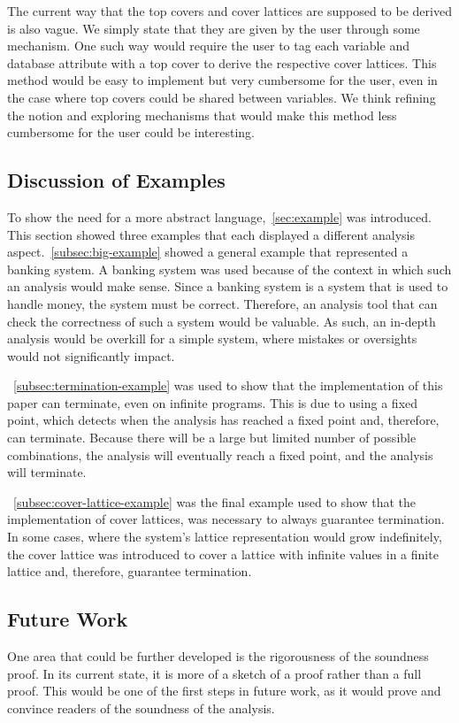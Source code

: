 The current way that the top covers and cover lattices are supposed to be derived is also vague. We simply state that they are given by the user through some mechanism.
One such way would require the user to tag each variable and database attribute with a top cover to derive the respective cover lattices.
This method would be easy to implement but very cumbersome for the user, even in the case where top covers could be shared between variables.
We think refining the notion and exploring mechanisms that would make this method less cumbersome for the user could be interesting.


\subsection{Discussion of Examples}\label{subsec:example-discussion}
To show the need for a more abstract language,~\autoref{sec:example} was introduced. This section showed three examples that each displayed a different analysis aspect.~\autoref{subsec:big-example} showed a general example that represented a banking system. A banking system was used because of the context in which such an analysis would make sense. Since a banking system is a system that is used to handle money, the system must be correct. Therefore, an analysis tool that can check the correctness of such a system would be valuable. As such, an in-depth analysis would be overkill for a simple system, where mistakes or oversights would not significantly impact.

~\autoref{subsec:termination-example} was used to show that the implementation of this paper can terminate, even on infinite programs. This is due to using a fixed point, which detects when the analysis has reached a fixed point and, therefore, can terminate.
Because there will be a large but limited number of possible combinations, the analysis will eventually reach a fixed point, and the analysis will terminate.

~\autoref{subsec:cover-lattice-example} was the final example used to show that the implementation of cover lattices, was necessary to always guarantee termination. In some cases, where the system's lattice representation would grow indefinitely, the cover lattice was introduced to cover a lattice with infinite values in a finite lattice and, therefore, guarantee termination.


\subsection{Future Work}\label{subsec:future-work}
One area that could be further developed is the rigorousness of the soundness proof. In its current state, it is more of a sketch of a proof rather than a full proof.
This would be one of the first steps in future work, as it would prove and convince readers of the soundness of the analysis.

